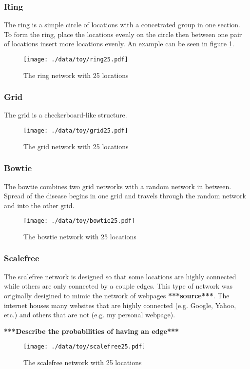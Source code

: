 \documentclass[11pt]{article}
\newcommand{\attn}[1]{\textbf{***{#1}***}}
\newcommand{\src}{\attn{source}}
\begin{document}
\subsubsection{Ring}
\label{sec-1-3-3}

The ring is a simple circle of locations with a concetrated group in one
section.  To form the ring, place the locations evenly on the circle
then between one pair of locations insert more locations evenly.  An
example can be seen in figure \ref{fig:ring25}.

\begin{figure}[htb]
\centering
\texttt{[image: ./data/toy/ring25.pdf]}
\caption{\label{fig:ring25}The ring network with 25 locations}
\end{figure}


\subsubsection{Grid}
\label{sec-1-3-4}

The grid is a checkerboard-like structure.

\begin{figure}[htb]
\centering
\texttt{[image: ./data/toy/grid25.pdf]}
\caption{\label{fig:grid25}The grid network with 25 locations}
\end{figure}

\subsubsection{Bowtie}
\label{sec-1-3-5}

The bowtie combines two grid networks with a random network in
between.  Spread of the disease begins in one grid and travels through
the random network and into the other grid.

\begin{figure}[htb]
\centering
\texttt{[image: ./data/toy/bowtie25.pdf]}
\caption{\label{fig:bowtie25}The bowtie network with 25 locations}
\end{figure}


\subsubsection{Scalefree}
\label{sec-1-3-6}

The scalefree network is designed so that some locations are highly
connected while others are only connected by a couple edges.  This
type of network was originally desigined to mimic the network of
webpages \src.  The internet houses many websites that are highly
connected (e.g. Google, Yahoo, etc.) and others that are not (e.g.  my
personal webpage).

\attn{Describe the probabilities of having an edge}

\begin{figure}[htb]
\centering
\texttt{[image: ./data/toy/scalefree25.pdf]}
\caption{\label{fig:scalefree25}The scalefree network with 25 locations}
\end{figure}
\end{document}
